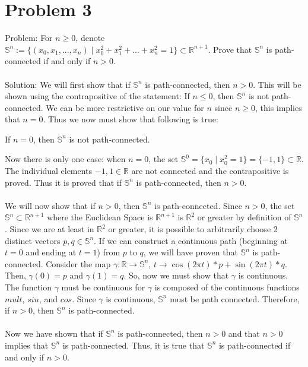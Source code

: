 \documentclass{article}
\begin{document}
\section*{Problem 3}

Problem: For $n \geq 0$, denote $\mathbb{S}^n := \{ (x_0, x_1, ..., x_n) \mid x_0^2 + x_1^2 + ... + x_n^2 = 1 \} \subset \mathbb{R}^{n+1}$. Prove that $\mathbb{S}^n$ is path-connected if and only if $n > 0$.\\\\
Solution: We will first show that if $\mathbb{S}^n$ is path-connected, then $n > 0$. This will be shown using the contrapositive of the statement: If $n \leq 0$, then $\mathbb{S}^n$ is not path-connected.
We can be more restrictive on our value for $n$ since $n \geq 0$, this implies that $n = 0$. Thus we now must show that following is true:
\begin{center}
	If $n = 0$, then $\mathbb{S}^n$ is not path-connected.
\end{center}
Now there is only one case: when $n = 0$, the set $\mathbb{S}^0 = \{ x_0 \mid x_0^2 = 1 \} = \{ -1, 1 \} \subset \mathbb{R}$. The individual elements $-1, 1 \in \mathbb{R}$ are not connected and the contrapositive is proved. Thus it is proved that if $\mathbb{S}^n$ is path-connected, then $n > 0$. \\\\
We will now show that if $n > 0$, then $\mathbb{S}^n$ is path-connected. Since $n > 0$, the set $\mathbb{S}^n \subset \mathbb{R}^{n+1}$ where the Euclidean Space is $\mathbb{R}^{n+1}$ is $\mathbb{R}^{2}$ or greater by definition of $\mathbb{S}^n$. 
Since we are at least in $\mathbb{R}^2$ or greater, it is possible to arbitrarily choose 2 distinct vectors $p,q \in \mathbb{S}^n$.
If we can construct a continuous path (beginning at $t = 0$ and ending at $t = 1$) from $p$ to $q$, we will have proven that $\mathbb{S}^n$ is path-connected.
Consider the map $\gamma : \mathbb{R} \to \mathbb{S}^n$, $t \to \cos (2\pi t) * p + \sin (2 \pi t) * q$.
Then, $\gamma (0) = p$ and $\gamma (1) = q$. So, now we must show that $\gamma$ is continuous.
The function $\gamma$ must be continuous for $\gamma$ is composed of the continuous functions $mult$, $sin$, and $cos$. Since $\gamma$ is continuous, $\mathbb{S}^n$ must be path connected.
Therefore, if $n > 0$, then $\mathbb{S}^n$ is path-connected. \\\\
Now we have shown that if $\mathbb{S}^n$ is path-connected, then $n > 0$ and that $n > 0$ implies that $\mathbb{S}^n$ is path-connected. Thus, it is true that $\mathbb{S}^n$ is path-connected if and only if $n > 0$.
\end{document}
